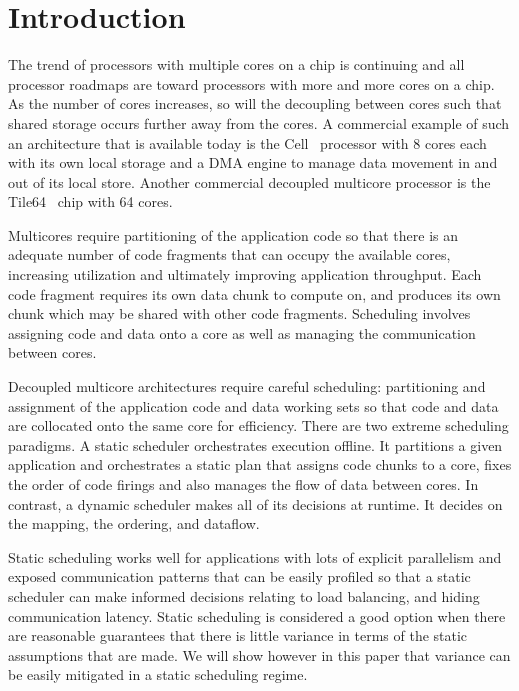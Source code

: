\section{Introduction}

The trend of processors with multiple cores on a chip is continuing
and all processor roadmaps are toward processors with more and more
cores on a chip. As the number of cores increases, so will the
decoupling between cores such that shared storage occurs further away
from the cores. A commercial example of such an architecture that is
available today is the Cell~\cite{cell} processor with 8 cores each
with its own local storage and a DMA engine to manage data movement in
and out of its local store. Another commercial decoupled multicore
processor is the Tile64~\cite{tilera} chip with 64 cores.

Multicores require partitioning of the application code so that there
is an adequate number of code fragments that can occupy the available
cores, increasing utilization and ultimately improving application throughput.
Each code fragment requires its own data chunk to compute on, and
produces its own chunk which may be shared with other code fragments.
Scheduling involves assigning code and data onto a core as well as
managing the communication between cores.

Decoupled multicore architectures require careful scheduling:
partitioning and assignment of the application code and data working
sets so that code and data are collocated onto the same core for
efficiency. There are two extreme scheduling paradigms. A
static scheduler orchestrates execution offline. It partitions a given application and
orchestrates a static plan that assigns code chunks to a core, fixes the
order of code firings and also manages the flow of data between
cores. In contrast, a dynamic scheduler makes all of its decisions at
runtime. It decides on the mapping, the ordering, and dataflow.

Static scheduling works well for applications with lots of explicit
parallelism and exposed communication patterns that can be easily
profiled so that a static scheduler can make informed decisions
relating to load balancing, and hiding communication latency.
Static scheduling is considered a good option when there are
reasonable guarantees that there is little variance in terms of the
static assumptions that are made. We will show however in this paper
that variance can be easily mitigated in a static scheduling regime.

